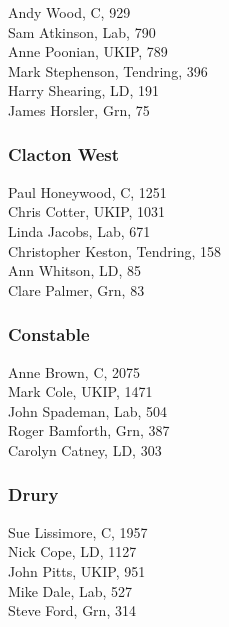 \documentclass[a4paper,openany,10pt]{book}
\begin{document}


Andy Wood, C, 929\\
Sam Atkinson, Lab, 790\\
Anne Poonian, UKIP, 789\\
Mark Stephenson, Tendring, 396\\
Harry Shearing, LD, 191\\
James Horsler, Grn, 75\\


\subsubsection*{Clacton West}



Paul Honeywood, C, 1251\\
Chris Cotter, UKIP, 1031\\
Linda Jacobs, Lab, 671\\
Christopher Keston, Tendring, 158\\
Ann Whitson, LD, 85\\
Clare Palmer, Grn, 83\\


\subsubsection*{Constable}



Anne Brown, C, 2075\\
Mark Cole, UKIP, 1471\\
John Spademan, Lab, 504\\
Roger Bamforth, Grn, 387\\
Carolyn Catney, LD, 303\\


\subsubsection*{Drury}



Sue Lissimore, C, 1957\\
Nick Cope, LD, 1127\\
John Pitts, UKIP, 951\\
Mike Dale, Lab, 527\\
Steve Ford, Grn, 314\\
\end{document}

